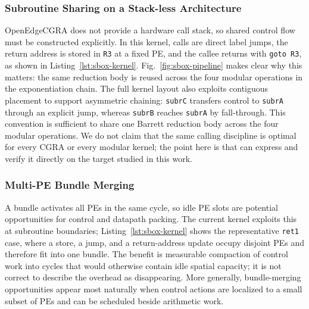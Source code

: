 \subsubsection{Subroutine Sharing on a Stack-less Architecture}
\label{subsubsec:subroutine-sharing}

OpenEdgeCGRA does not provide a hardware call stack, so shared control flow must be constructed explicitly. In this kernel, calls are direct label jumps, the return address is stored in \texttt{R3} at a fixed PE, and the callee returns with \texttt{goto R3}, as shown in Listing~\ref{lst:sbox-kernel}. Fig.~\ref{fig:sbox-pipeline} makes clear why this matters: the same reduction body is reused across the four modular operations in the exponentiation chain. The full kernel layout also exploits contiguous placement to support asymmetric chaining: \texttt{subrC} transfers control to \texttt{subrA} through an explicit jump, whereas \texttt{subrB} reaches \texttt{subrA} by fall-through. This convention is sufficient to share one Barrett reduction body across the four modular operations. We do not claim that the same calling discipline is optimal for every CGRA or every modular kernel; the point here is that \castm{} can express and verify it directly on the target studied in this work.



\subsubsection{Multi-PE Bundle Merging}
\label{subsubsec:merging}

A bundle activates all PEs in the same cycle, so idle PE slots are potential opportunities for control and datapath packing. The current kernel exploits this at subroutine boundaries; Listing~\ref{lst:sbox-kernel} shows the representative \texttt{ret1} case, where a store, a jump, and a return-address update occupy disjoint PEs and therefore fit into one bundle. The benefit is measurable compaction of control work into cycles that would otherwise contain idle spatial capacity; it is not correct to describe the overhead as disappearing. More generally, bundle-merging opportunities appear most naturally when control actions are localized to a small subset of PEs and can be scheduled beside arithmetic work. 


